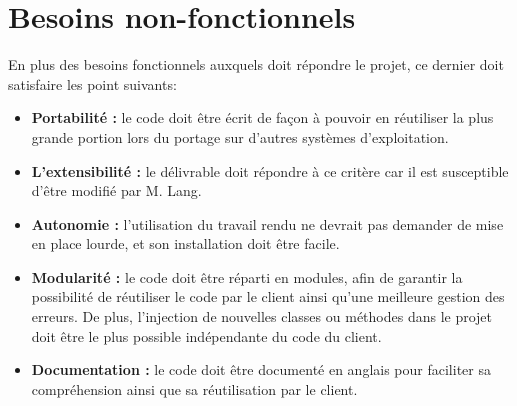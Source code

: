 \section{Besoins non-fonctionnels}
En plus des besoins fonctionnels auxquels doit répondre le projet, ce dernier doit satisfaire les point suivants:\\
\begin{itemize}
\item \textbf{Portabilité :} le code doit être écrit de façon à pouvoir en réutiliser la plus grande portion lors du portage sur d'autres systèmes d'exploitation.\\
\item \textbf{L'extensibilité :} le délivrable doit répondre à ce critère car il est susceptible d'être modifié par M. Lang.\\
\item \textbf{Autonomie :} l'utilisation du travail rendu ne devrait pas demander de mise en place lourde, et son installation doit être facile.\\
\item \textbf{Modularité :} le code doit être réparti en modules, afin de garantir la possibilité de réutiliser le code par le client ainsi qu'une meilleure gestion des erreurs. De plus, l'injection de nouvelles classes ou méthodes dans le projet doit être le plus possible indépendante du code du client.\\
\item \textbf{Documentation :} le code doit être documenté en anglais pour faciliter sa compréhension ainsi que sa réutilisation par le client.\\

\end{itemize}


